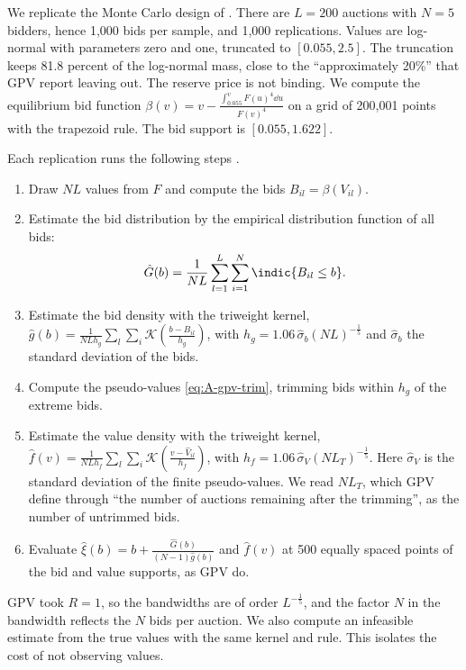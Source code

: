 We replicate the Monte Carlo design of \citet[Section~2.4]{GuerrePerrigneVuong2000}. There are $L=200$
auctions with $N=5$ bidders, hence 1,000 bids per sample, and 1,000 replications. Values are
log-normal with parameters zero and one, truncated to $[0.055,2.5]$. The truncation keeps 81.8 percent
of the log-normal mass, close to the ``approximately 20\%'' that GPV report leaving out. The reserve
price is not binding. We compute the equilibrium bid function
$\beta(v)=v-\frac{\int_{0.055}^{v}F(u)^{4}\dd u}{F(v)^{4}}$ on a grid of 200,001 points with the
trapezoid rule. The bid support is $[0.055,1.622]$.

\begin{remark}\label{rem:A-gpv-algorithm}
Each replication runs the following steps \citep[eqs.~(4)--(7)]{GuerrePerrigneVuong2000}.
\begin{enumerate}
\item Draw $NL$ values from $F$ and compute the bids $B_{il}=\beta(V_{il})$.
\item Estimate the bid distribution by the empirical distribution function of all bids:
\[
\hat G(b)=\frac{1}{NL}\sum_{l=1}^{L}\sum_{i=1}^{N}\indic\{B_{il}\le b\}.
\]
\item Estimate the bid density with the triweight kernel,
$\hat g(b)=\frac{1}{NLh_g}\sum_{l}\sum_{i}\mathcal{K}(\frac{b-B_{il}}{h_g})$, with
$h_g=1.06\,\hat\sigma_b(NL)^{-\frac{1}{5}}$ and $\hat\sigma_b$ the standard deviation of the bids.
\item Compute the pseudo-values \eqref{eq:A-gpv-trim}, trimming bids within $h_g$ of the extreme bids.
\item Estimate the value density with the triweight kernel,
$\hat f(v)=\frac{1}{NLh_f}\sum_{l}\sum_{i}\mathcal{K}(\frac{v-\hat V_{il}}{h_f})$, with
$h_f=1.06\,\hat\sigma_V(NL_T)^{-\frac{1}{5}}$. Here $\hat\sigma_V$ is the standard deviation of the finite
pseudo-values. We read $NL_T$, which GPV define through ``the number of auctions remaining after the
trimming'', as the number of untrimmed bids.
\item Evaluate $\hat\xi(b)=b+\frac{\hat G(b)}{(N-1)\hat g(b)}$ and $\hat f(v)$ at 500 equally spaced points
of the bid and value supports, as GPV do.
\end{enumerate}
\end{remark}

GPV took $R=1$, so the bandwidths are of order $L^{-\frac{1}{5}}$, and the factor $N$ in the bandwidth
reflects the $N$ bids per auction. We also compute an infeasible estimate from the true values with the
same kernel and rule. This isolates the cost of not observing values.

